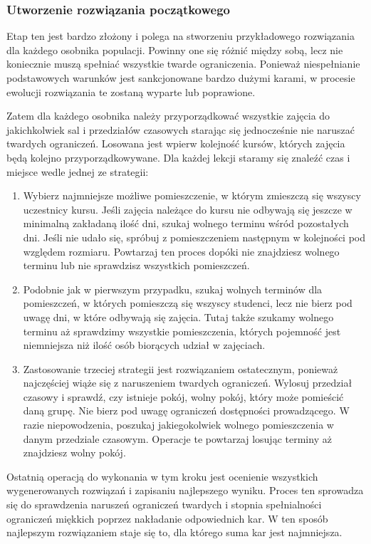 \subsubsection{Utworzenie rozwiązania początkowego}
\par Etap ten jest bardzo złożony i polega na stworzeniu przykładowego rozwiązania dla każdego osobnika populacji. Powinny one się różnić między sobą, lecz nie koniecznie muszą spełniać wszystkie twarde ograniczenia. Ponieważ niespełnianie podstawowych warunków jest sankcjonowane bardzo dużymi karami, w procesie ewolucji rozwiązania te zostaną wyparte lub poprawione.
\par Zatem dla każdego osobnika należy przyporządkować wszystkie zajęcia do jakichkolwiek sal i przedziałów czasowych starając się jednocześnie nie naruszać twardych ograniczeń. Losowana jest wpierw kolejność kursów, których zajęcia będą kolejno przyporządkowywane. Dla każdej lekcji staramy się znaleźć czas i miejsce wedle jednej ze strategii:
\begin{enumerate}
\item Wybierz najmniejsze możliwe pomieszczenie, w którym zmieszczą się wszyscy uczestnicy kursu. Jeśli zajęcia należące do kursu nie odbywają się jeszcze w minimalną zakładaną ilość dni, szukaj wolnego terminu wśród pozostałych dni. Jeśli nie udało się, spróbuj z pomieszczeniem następnym w kolejności pod względem rozmiaru. Powtarzaj ten proces dopóki nie znajdziesz wolnego terminu lub nie sprawdzisz wszystkich pomieszczeń.
\item Podobnie jak w pierwszym przypadku, szukaj wolnych terminów dla pomieszczeń, w których pomieszczą się wszyscy studenci, lecz nie bierz pod uwagę dni, w które odbywają się zajęcia. Tutaj także szukamy wolnego terminu aż sprawdzimy wszystkie pomieszczenia, których pojemność jest niemniejsza niż ilość osób biorących udział w zajęciach.
\item Zastosowanie trzeciej strategii jest rozwiązaniem ostatecznym, ponieważ najczęściej wiąże się z naruszeniem twardych ograniczeń.  Wylosuj przedział czasowy i sprawdź, czy istnieje pokój, wolny pokój, który może pomieścić daną grupę. Nie bierz pod uwagę ograniczeń dostępności prowadzącego. W razie niepowodzenia, poszukaj jakiegokolwiek wolnego pomieszczenia w danym przedziale czasowym. Operacje te powtarzaj losując terminy aż znajdziesz wolny pokój.
\end{enumerate}
\par Ostatnią operacją do wykonania w tym kroku jest ocenienie wszystkich wygenerowanych rozwiązań i zapisaniu najlepszego wyniku. Proces ten sprowadza się do sprawdzenia naruszeń ograniczeń twardych i stopnia spełnialności ograniczeń miękkich poprzez nakładanie odpowiednich kar. W ten sposób najlepszym rozwiązaniem staje się to, dla którego suma kar jest najmniejsza.
